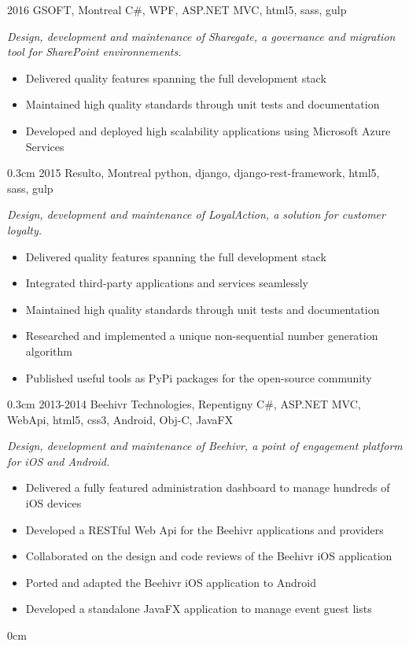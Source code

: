 \documentclass[]{friggeri-cv}
\begin{document}
\begin{entrylist}
  \entry
    {2016}
    {GSOFT, Montreal}
    {C\#, WPF, ASP.NET MVC, html5, sass, gulp}
    {\emph{Design, development and maintenance of Sharegate, a governance and migration tool for SharePoint environnements.}
    \vspace{0.1cm}
    \begin{itemize}
      \item Delivered quality features spanning the full development stack
      \item Maintained high quality standards through unit tests and documentation
      \item Developed and deployed high scalability applications using Microsoft Azure Services
    \end{itemize}}
    {0.3cm}
  \entry
    {2015}
    {Resulto, Montreal}
    {python, django, django-rest-framework, html5, sass, gulp}
    {\emph{Design, development and maintenance of LoyalAction, a solution for customer loyalty.}
    \vspace{0.1cm}
    \begin{itemize}
      \item Delivered quality features spanning the full development stack
      \item Integrated third-party applications and services seamlessly
      \item Maintained high quality standards through unit tests and documentation
      \item Researched and implemented a unique non-sequential number generation algorithm
      \item Published useful tools as PyPi packages for the open-source community
    \end{itemize}}
    {0.3cm}
  \entry
    {2013-2014}
    {Beehivr Technologies, Repentigny}
    {C\#, ASP.NET MVC, WebApi, html5, css3, Android, Obj-C, JavaFX}
    {\emph{Design, development and maintenance of Beehivr, a point of engagement platform for iOS and Android.}
    \vspace{0.1cm}
    \begin{itemize}
      \item Delivered a fully featured administration dashboard to manage hundreds of iOS devices
      \item Developed a RESTful Web Api for the Beehivr applications and providers
      \item Collaborated on the design and code reviews of the Beehivr iOS application
      \item Ported and adapted the Beehivr iOS application to Android
      \item Developed a standalone JavaFX application to manage event guest lists
    \end{itemize}}
    {0cm}
\end{entrylist}
\end{document}
